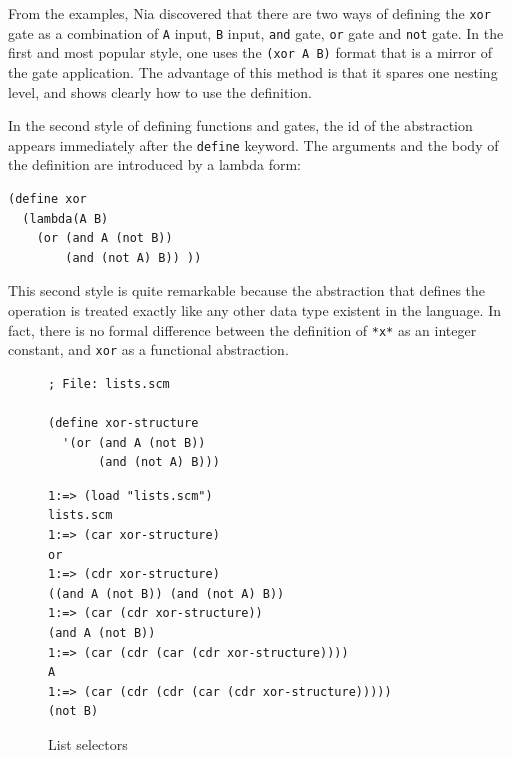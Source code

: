 \documentclass[a4paper,12pt]{book}
\newenvironment{fmpage}[1]
           {\begin{lrbox}{\fmbox}\begin{minipage}{#1}}
           {\end{minipage}\end{lrbox}\fbox{\usebox{\fmbox}}}
\begin{document}
From the examples, Nia discovered that there
are two ways of defining the \verb|xor| gate
as a combination of \verb|A| input, \verb|B| input,
\verb|and| gate, \verb|or| gate
and \verb|not| gate. In the first and
most popular style, one uses the
\verb|(xor A B)| format that is a mirror of
the gate application. The advantage of
this method is that it spares one
nesting level, and shows clearly how to use
the definition. 

In the second style of defining functions and
gates, the id of the abstraction 
appears immediately after the \verb|define|
keyword. The  arguments and the body of
the definition are introduced by a lambda form:
\label{page:lambda1}

\begin{verbatim}
(define xor
  (lambda(A B)
    (or (and A (not B))
        (and (not A) B)) ))
\end{verbatim}

This second style is quite remarkable because
the abstraction that defines the operation
is treated exactly like any other
data type existent in the language.
In fact, there is no formal difference
between the definition of \verb|*x*|
as an integer constant, and \verb|xor|
as a functional abstraction.

\begin{figure}[!h]
\begin{fmpage}{0.8\linewidth}
\begin{verbatim}
; File: lists.scm

(define xor-structure
  '(or (and A (not B))
       (and (not A) B)))
\end{verbatim}
\end{fmpage}

\begin{fmpage}{0.8\linewidth}
\begin{verbatim}
1:=> (load "lists.scm")
lists.scm
1:=> (car xor-structure)
or
1:=> (cdr xor-structure)
((and A (not B)) (and (not A) B))
1:=> (car (cdr xor-structure))
(and A (not B))
1:=> (car (cdr (car (cdr xor-structure))))
A
1:=> (car (cdr (cdr (car (cdr xor-structure)))))
(not B)
\end{verbatim}
\end{fmpage}

\begin{fmpage}{0.8\linewidth}
\verb||
\end{fmpage}
\caption{List selectors}
\label{fig:selectors}
\end{figure}
\end{document}
